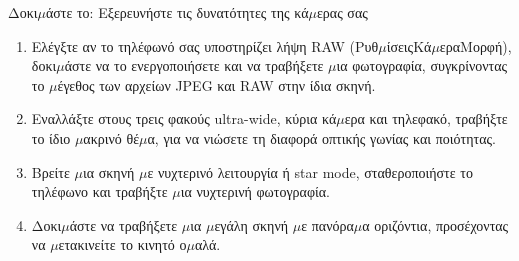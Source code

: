 \begin{tcbpractice}{Δοκι$\mu$άστε το: Εξερευνήστε τις δυνατότητες της κά$\mu$ερας σας}
\begin{enumerate}
  \item Ελέγξτε αν το τηλέφωνό σας υποστηρίζει λήψη RAW (Ρυθ$\mu$ίσειςΚά$\mu$εραΜορφή), δοκι$\mu$άστε να το ενεργοποιήσετε και να τραβήξετε $\mu$ια φωτογραφία, συγκρίνοντας το $\mu$έγεθος των αρχείων JPEG και RAW στην ίδια σκηνή.
  \item Εναλλάξτε στους τρεις φακούς ultra-wide, κύρια κά$\mu$ερα και τηλεφακό, τραβήξτε το ίδιο $\mu$ακρινό θέ$\mu$α, για να νιώσετε τη διαφορά οπτικής γωνίας και ποιότητας.
  \item Βρείτε $\mu$ια σκηνή $\mu$ε νυχτερινό λειτουργία ή star mode, σταθεροποιήστε το τηλέφωνο και τραβήξτε $\mu$ια νυχτερινή φωτογραφία.
  \item Δοκι$\mu$άστε να τραβήξετε $\mu$ια $\mu$εγάλη σκηνή $\mu$ε πανόρα$\mu$α οριζόντια, προσέχοντας να $\mu$ετακινείτε το κινητό ο$\mu$αλά.
\end{enumerate}

\end{tcbpractice}
